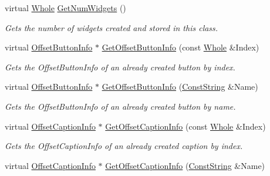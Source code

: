 \begin{DoxyCompactItemize}
virtual \hyperlink{namespaceMezzanine_adcbb6ce6d1eb4379d109e51171e2e493}{Whole} \hyperlink{classMezzanine_1_1UI_1_1RenderableContainerWidget_a0f37f929679f1472ef23c3cf8e4c38bc}{GetNumWidgets} ()
\begin{DoxyCompactList}\small\item\em Gets the number of widgets created and stored in this class. \item\end{DoxyCompactList}\item 
virtual \hyperlink{structMezzanine_1_1UI_1_1ResizingInfo}{OffsetButtonInfo} $\ast$ \hyperlink{classMezzanine_1_1UI_1_1RenderableContainerWidget_ac4842f3ccc449a30397041556aebeaa5}{GetOffsetButtonInfo} (const \hyperlink{namespaceMezzanine_adcbb6ce6d1eb4379d109e51171e2e493}{Whole} \&Index)
\begin{DoxyCompactList}\small\item\em Gets the OffsetButtonInfo of an already created button by index. \item\end{DoxyCompactList}\item 
virtual \hyperlink{structMezzanine_1_1UI_1_1ResizingInfo}{OffsetButtonInfo} $\ast$ \hyperlink{classMezzanine_1_1UI_1_1RenderableContainerWidget_ae04b7304acf969c7b5b11417268bf458}{GetOffsetButtonInfo} (\hyperlink{namespaceMezzanine_a63cd699ac54b73953f35ec9cfc05e506}{ConstString} \&Name)
\begin{DoxyCompactList}\small\item\em Gets the OffsetButtonInfo of an already created button by name. \item\end{DoxyCompactList}\item 
virtual \hyperlink{structMezzanine_1_1UI_1_1ResizingInfo}{OffsetCaptionInfo} $\ast$ \hyperlink{classMezzanine_1_1UI_1_1RenderableContainerWidget_a6bb021b2eec02f089672f624ce4f0ffb}{GetOffsetCaptionInfo} (const \hyperlink{namespaceMezzanine_adcbb6ce6d1eb4379d109e51171e2e493}{Whole} \&Index)
\begin{DoxyCompactList}\small\item\em Gets the OffsetCaptionInfo of an already created caption by index. \item\end{DoxyCompactList}\item 
virtual \hyperlink{structMezzanine_1_1UI_1_1ResizingInfo}{OffsetCaptionInfo} $\ast$ \hyperlink{classMezzanine_1_1UI_1_1RenderableContainerWidget_a2de9ad86228863ce264137dcf0e98ec5}{GetOffsetCaptionInfo} (\hyperlink{namespaceMezzanine_a63cd699ac54b73953f35ec9cfc05e506}{ConstString} \&Name)

\end{DoxyCompactItemize}
